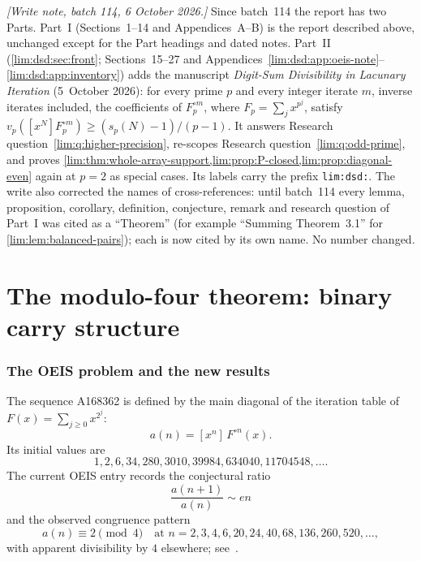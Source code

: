 \documentclass[11pt]{article}
\theoremstyle{definition}
\theoremstyle{remark}
\newcommand{\coef}[2]{[x^{#1}]\,#2}
\begin{document}
\emph{[Write note, batch 114, 6 October 2026.]} Since batch~114 the report has two Parts. Part~I
(Sections~1--14 and Appendices~A--B) is the report described above,
unchanged except for the Part headings and dated notes. Part~II
(\cref{lim:dsd:sec:front}; Sections~15--27 and
Appendices~\ref{lim:dsd:app:oeis-note}--\ref{lim:dsd:app:inventory}) adds
the manuscript \emph{Digit-Sum Divisibility in Lacunary Iteration}
(5~October 2026): for every prime $p$ and every integer iterate $m$,
inverse iterates included, the coefficients of $F_p^{\circ m}$, where
$F_p=\sum_jx^{p^j}$, satisfy $v_p([x^N]F_p^{\circ m})\ge(s_p(N)-1)/(p-1)$.
It answers Research question~\ref{lim:q:higher-precision}, re-scopes
Research question~\ref{lim:q:odd-prime}, and proves
\cref{lim:thm:whole-array-support,lim:prop:P-closed,lim:prop:diagonal-even}
again at $p=2$ as special cases. Its labels carry the prefix
\texttt{lim:dsd:}. The write also corrected the names of
cross-references: until batch~114 every lemma, proposition, corollary,
definition, conjecture, remark and research question of Part~I was cited
as a ``Theorem'' (for example ``Summing Theorem~3.1'' for
\cref{lim:lem:balanced-pairs}); each is now cited by its own name. No
number changed.

\tableofcontents

\part{The modulo-four theorem: binary carry structure}


\section{The OEIS problem and the new results}

The sequence A168362 is defined by the main diagonal of the iteration table of
$F(x)=\sum_{j\ge0}x^{2^j}$:
\begin{equation}\label{lim:eq:def-a}
  a(n)=\coef{n}{F^{\circ n}(x)}.
\end{equation}
Its initial values are
\[
1,2,6,34,280,3010,39984,634040,11704548,\ldots.
\]
The current OEIS entry records the conjectural ratio
\begin{equation}\label{lim:eq:ratio-conj}
  \frac{a(n+1)}{a(n)}\sim en
\end{equation}
and the observed congruence pattern
\begin{equation}\label{lim:eq:oeis-mod4-observation}
  a(n)\equiv2\pmod4
  \quad\text{at }n=2,3,4,6,20,24,40,68,136,260,520,\ldots,
\end{equation}
with apparent divisibility by $4$ elsewhere; see~\cite{OEIS-A168362}.
\end{document}
